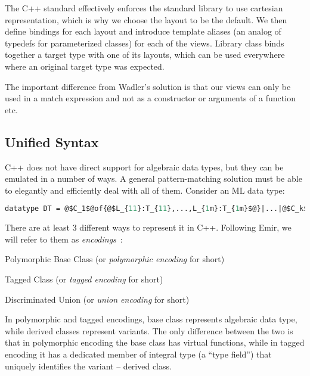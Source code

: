 \noindent
The C++ standard effectively enforces the standard library to use cartesian 
representation\cite[-4]{C++11}, which is why we choose the 
 layout to be the default. We then define bindings for each 
layout and introduce template aliases (an analog of typedefs for parameterized 
classes) for each of the views. Library class  binds together a 
target type with one of its layouts, which can be used everywhere where an 
original target type was expected.

The important difference from Wadler's solution is that our views can only be 
used in a match expression and not as a constructor or arguments of a function 
etc.

\subsection{Unified Syntax}
\label{sec:unisyn}

C++ does not have direct support for algebraic data types, but they can be 
emulated in a number of ways. A general pattern-matching solution must be able 
to elegantly and efficiently deal with all of them. Consider an ML data type: 

\begin{lstlisting}[language=ML,escapechar=@]
datatype DT = @$C_1$@of{@$L_{11}:T_{11},...,L_{1m}:T_{1m}$@}|...|@$C_k$@of{@$L_{k1}:T_{k1},...,L_{kn}:T_{kn}$@}
\end{lstlisting}

\noindent There are at least 3 different ways to represent it in C++. Following 
Emir, we will refer to them as \emph{encodings}~\cite{EmirThesis}:

\begin{compactitem}
\setlength{\itemsep}{0pt}
\setlength{\parskip}{0pt}
\item Polymorphic Base Class (or \emph{polymorphic encoding} for short)
\item Tagged Class (or \emph{tagged encoding} for short)
\item Discriminated Union (or \emph{union encoding} for short)
\end{compactitem}

\noindent
In polymorphic and tagged encodings, base class  represents algebraic 
data type, while derived classes represent variants. The only difference between 
the two is that in polymorphic encoding the base class has virtual functions, while 
in tagged encoding it has a dedicated member of integral type  (a ``type field'')  that uniquely 
identifies the variant -- derived class. 


